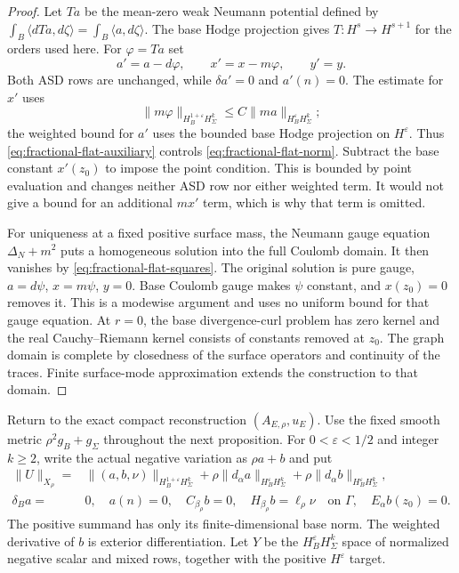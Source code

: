 \documentclass[11pt]{amsart}
\theoremstyle{definition}
\theoremstyle{remark}
\theoremstyle{plain}
\begin{document}
\begin{proof}
Let $Ta$ be the mean-zero weak Neumann potential defined by
$\int_B\langle dTa,d\zeta\rangle=\int_B\langle a,d\zeta\rangle$.
The base Hodge projection gives $T:H^s\to H^{s+1}$ for the
orders used here. For $\varphi=Ta$ set
\[
 a'=a-d\varphi,\qquad x'=x-m\varphi,\qquad y'=y.
\]
Both ASD rows are unchanged, while $\delta a'=0$ and $a'(n)=0$.
The estimate for $x'$ uses
\[
 \|m\varphi\|_{H_B^{1+\varepsilon}H_\Sigma^k}
             \leq C\|ma\|_{H_B^\varepsilon H_\Sigma^k};
\]
the weighted bound for $a'$ uses the bounded base Hodge projection
on $H^\varepsilon$. Thus \eqref{eq:fractional-flat-auxiliary}
controls \eqref{eq:fractional-flat-norm}. Subtract the base constant
$x'(z_0)$ to impose the point condition. This is bounded by point
evaluation and changes neither ASD row nor either weighted term.
It would not give a bound for an additional $mx'$ term, which is
why that term is omitted.

For uniqueness at a fixed positive surface mass, the Neumann
gauge equation $\Delta_N+m^2$ puts a homogeneous solution into
the full Coulomb domain. It then vanishes by
\eqref{eq:fractional-flat-squares}. The original solution is pure
gauge, $a=d\psi$, $x=m\psi$, $y=0$. Base Coulomb gauge makes
$\psi$ constant, and $x(z_0)=0$ removes it. This is a modewise
argument and uses no uniform bound for that gauge equation.
At $r=0$, the base divergence-curl problem has zero kernel and
the real Cauchy--Riemann kernel consists of constants removed at
$z_0$. The graph domain is complete by closedness of the surface
operators and continuity of the traces. Finite surface-mode
approximation extends the construction to that domain.
\end{proof}

Return to the exact compact reconstruction $(A_{E,\rho},u_E)$.
Use the fixed smooth metric $\rho^2g_B+g_\Sigma$ throughout the
next proposition. For $0<\varepsilon<1/2$ and integer $k\geq2$,
write the actual negative variation as $\rho a+b$ and put
\begin{equation}\label{eq:compact-fractional-graph}
 \begin{split}
 \|U\|_{X_\rho}={}&
 \|(a,b,\nu)\|_{H_B^{1+\varepsilon}H_\Sigma^k}
 +\rho\|d_\alpha a\|_{H_B^\varepsilon H_\Sigma^k}
 +\rho\|d_\alpha b\|_{H_B^\varepsilon H_\Sigma^k},\\
 \delta_Ba={}&0,\quad a(n)=0,\quad
 C_{\beta_\rho}b=0,\quad H_{\beta_\rho}b=\ell_\rho\nu
 \quad\text{on }\Gamma,\quad E_\alpha b(z_0)=0.
 \end{split}
\end{equation}
The positive summand has only its finite-dimensional base norm.
The weighted derivative of $b$ is exterior differentiation.
Let $Y$ be the $H_B^\varepsilon H_\Sigma^k$ space of normalized
negative scalar and mixed rows, together with the positive
$H^\varepsilon$ target.
\end{document}
